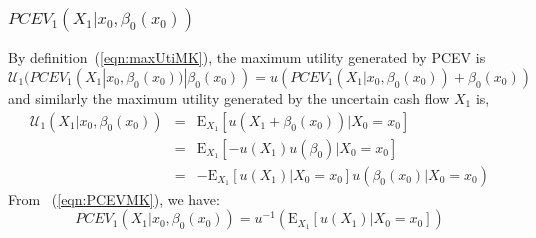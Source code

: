 \documentclass{article}[12pt letter]
\newcommand{\E}{\mathrm{E}}
\begin{document}
\subsubsection{$PCEV_1(X_1|x_0,\beta_0(x_0))$}
By definition~(\ref{eqn:maxUtiMK}), the maximum utility generated by PCEV is
\[\mathcal{U}_1(PCEV_1(X_1|x_0,\beta_0(x_0))|\beta_0(x_0)) = u(PCEV_1(X_1|x_0,\beta_0(x_0)) + \beta_0(x_0))\]
and similarly the maximum utility generated by the uncertain cash flow $X_1$ is,
\begin{eqnarray*}
\mathcal{U}_1(X_1|x_0,\beta_0(x_0)) &=& \E_{X_1}[u(X_1 + \beta_0(x_0))|X_0=x_0]\\
&=&\E_{X_1}[-u(X_1)u(\beta_0)|X_0=x_0]\\
&=&-\E_{X_1}[u(X_1)|X_0=x_0]u(\beta_0(x_0)|X_0=x_0)
\end{eqnarray*}
From ~(\ref{eqn:PCEVMK}), we have:
\[PCEV_1(X_1|x_0,\beta_0(x_0)) = u^{-1}(\E_{X_1}[u(X_1)|X_0=x_0]) \]

\end{document}
